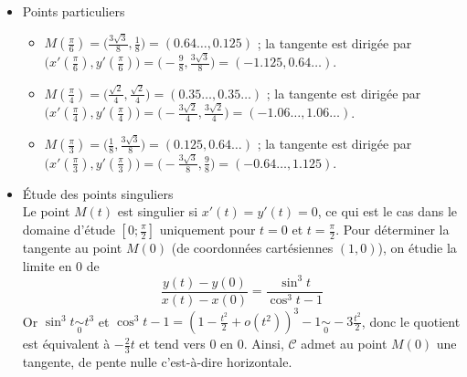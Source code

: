 {\begin{enumerate}
{\begin{itemize}
Cela signifie que lorsque $t$ varie de $0$ à $\frac\pi2$ la courbe va vers la gauche (car $x(t)$ décroît)
en montant (car $y(t)$ croît) du point $(1,0)$ à $(0,1)$.
\item Points particuliers\\
  \begin{itemize}
\item $M(\frac\pi6) = \big(\frac{3\sqrt3}{8},\frac18\big) = (0.64\ldots,0.125) $ ; 
    la tangente est dirigée par $\big(x'(\frac\pi6),y'(\frac\pi6)\big) = \big(-\frac98,\frac{3\sqrt3}{8} \big) = (-1.125,0.64\ldots)$.
\item $M(\frac\pi4) = \big(\frac{\sqrt2}{4},\frac{\sqrt2}{4}\big) = (0.35\ldots,0.35\ldots)$ ; 
    la tangente est dirigée par $\big(x'(\frac\pi4),y'(\frac\pi4)\big) = \big(-\frac{3\sqrt2}{4},\frac{3\sqrt2}{4}\big) = (-1.06\ldots,1.06\ldots)$.
\item $M(\frac\pi3) =  \big(\frac18,\frac{3\sqrt3}{8}\big) = (0.125,0.64\ldots)$ ;
    la tangente est dirigée par $\big(x'(\frac\pi3),y'(\frac\pi3)\big) = \big(-\frac{3\sqrt3}{8},\frac98\big) = (-0.64\ldots,1.125)$. 
  \end{itemize}
\item \'Etude des points singuliers\\
Le point $M(t)$ est singulier si $x'(t)=y'(t)=0$, ce qui est le cas dans le domaine d'étude $[0;\frac{\pi}{2}]$ uniquement pour $t=0$ et $t=\frac{\pi}{2}$. Pour déterminer la tangente au point $M(0)$ (de coordonnées cartésiennes $(1,0)$), on étudie la limite en 0 de 
$$\frac{y(t)-y(0)}{x(t)-x(0)}=\frac{\sin^3t}{\cos^3t-1}$$ 
Or $\sin^3t\underset{0}{\sim}t^3$ et $\cos^3t-1=(1-\frac{t^2}{2}+o(t^2))^3-1\underset{0}{\sim}-3\frac{t^2}{2}$, donc le quotient est équivalent à $-\frac{2}{3}t$ et tend vers 0 en 0. Ainsi, $\mathcal{C}$ admet au point $M(0)$ une tangente, de pente nulle c'est-à-dire horizontale.
\end{itemize}

\begin{center}
\end{center}}
\end{enumerate}}

